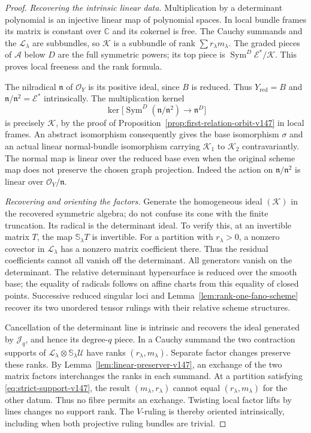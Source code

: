 \documentclass[11pt,reqno]{amsart}
\numberwithin{equation}{section}
\theoremstyle{definition}\newtheorem{definition}[theorem]{Definition}
\theoremstyle{remark}\newtheorem{remark}[theorem]{Remark}
\newcommand{\C}{\mathbb C}\newcommand{\Q}{\mathbb Q}
\newcommand{\OO}{\mathcal O}\newcommand{\II}{\mathcal I}
\DeclareMathOperator{\Sym}{Sym}\DeclareMathOperator{\Gr}{Gr}
\begin{document}
\begin{proof}
\emph{Recovering the intrinsic linear data.}
Multiplication by a determinant polynomial is an injective linear
map of polynomial spaces.  In local bundle frames its matrix is
constant over \(\C\) and its cokernel is free.  The Cauchy
summands and the \(\mathcal L_\lambda\) are subbundles, so
\(\mathcal K\) is a subbundle of rank
\(\sum r_\lambda m_\lambda\).  The graded pieces of
\(\mathcal A\) below \(D\) are the full symmetric powers;
its top piece is \(\Sym^D\mathcal E^*/\mathcal K\).
This proves local freeness and the rank formula.

The nilradical \(\mathfrak n\) of \(\OO_Y\) is its positive
ideal, since \(B\) is reduced.  Thus \(Y_{\mathrm{red}}=B\) and
\(\mathfrak n/\mathfrak n^2=\mathcal E^*\) intrinsically.
The multiplication kernel
\[
 \ker\bigl[\Sym^D(\mathfrak n/\mathfrak n^2)
                                    \longrightarrow\mathfrak n^D\bigr]
\]
is precisely \(\mathcal K\), by the proof of
Proposition~\ref{prop:first-relation-orbit-v147} in local frames.
An abstract isomorphism consequently gives the base isomorphism
\(\sigma\) and an actual linear normal-bundle isomorphism carrying
\(\mathcal K_1\) to \(\mathcal K_2\) contravariantly.  The
normal map is linear over the reduced base even when the original
scheme map does not preserve the chosen graph projection.  Indeed
the action on \(\mathfrak n/\mathfrak n^2\) is linear over
\(\OO_Y/\mathfrak n\).

\emph{Recovering and orienting the factors.}
Generate the homogeneous ideal \((\mathcal K)\) in the recovered
symmetric algebra; do not confuse its cone with the finite
truncation.  Its radical is the determinant ideal.  To verify this,
at an invertible matrix \(T\), the map
\(\mathbb S_\lambda T\) is invertible.  For a partition with
\(r_\lambda>0\), a nonzero covector in \(\mathcal L_\lambda\)
has a nonzero matrix coefficient there.  Thus the residual
coefficients cannot all vanish off the determinant.  All generators
vanish on the determinant.  The relative determinant hypersurface
is reduced over the smooth base; the equality of radicals follows
on affine charts from this equality of closed points.  Successive
reduced singular loci and Lemma~\ref{lem:rank-one-fano-scheme}
recover its two unordered tensor rulings with their relative scheme
structures.

Cancellation of the determinant line is intrinsic and recovers the
ideal generated by \(\mathcal J_q\), and hence its degree-\(q\)
piece.  In a Cauchy summand the two contraction supports of
\(\mathcal L_\lambda\otimes\mathbb S_\lambda\mathcal U\)
have ranks \((r_\lambda,m_\lambda)\).  Separate factor changes
preserve these ranks.  By Lemma~\ref{lem:linear-preserver-v147},
an exchange of the two matrix factors interchanges the ranks in
each summand.  At a partition satisfying
\eqref{eq:strict-support-v147}, the result
\((m_\lambda,r_\lambda)\) cannot equal
\((r_\lambda,m_\lambda)\) for the other datum.  Thus no fibre
permits an exchange.  Twisting local factor lifts by lines changes
no support rank.  The \(V\)-ruling is thereby oriented intrinsically,
including when both projective ruling bundles are trivial.


\end{proof}
\end{document}
